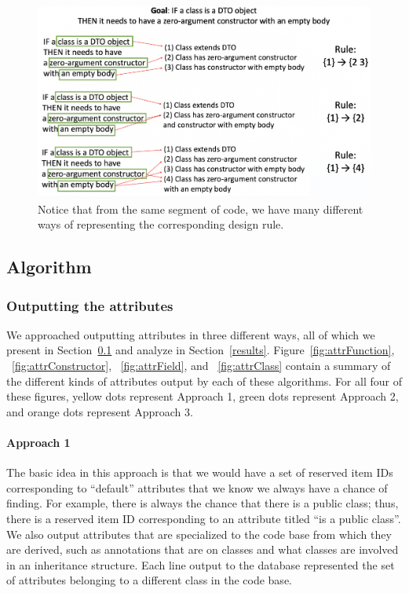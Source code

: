\documentclass[12pt]{article}
\begin{document}
\begin{figure}
  \includegraphics[width=\linewidth]{designRuleEx.png}
  \caption{Notice that from the same segment of code, we have many different ways of representing the corresponding design rule.}
  \label{fig:drEx}
\end{figure}





\subsection{Algorithm} \label{algm}

\subsubsection{Outputting the attributes}\label{algm_attrApproaches}

We approached outputting attributes in three different ways, all of which we present in Section~\ref{algm} and analyze in Section~\ref{results}. Figure~\ref{fig:attrFunction}, ~\ref{fig:attrConstructor}, ~\ref{fig:attrField}, and ~\ref{fig:attrClass} contain a summary of the different kinds of attributes output by each of these algorithms. For all four of these figures, yellow dots represent Approach 1, green dots represent Approach 2, and orange dots represent Approach 3.

	\paragraph{Approach 1}
	
	The basic idea in this approach is that we would have a set of reserved item IDs corresponding to “default” attributes that we know we always have a chance of finding. For example, there is always the chance that there is a public class; thus, there is a reserved item ID corresponding to an attribute titled “is a public class”. We also output attributes that are specialized to the code base from which they are derived, such as annotations that are on classes and what classes are involved in an inheritance structure. Each line output to the database represented the set of attributes belonging to a different class in the code base.
\end{document}

